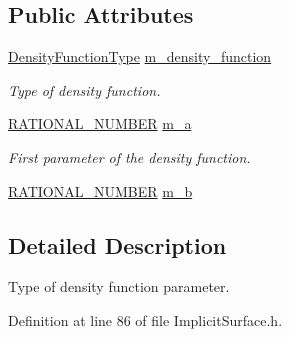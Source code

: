 \subsection*{Public Attributes}
\begin{DoxyCompactItemize}
\item 
\hyperlink{class_graphics_1_1_implicit_surface_ab19cb1eb5b21daefd95b6d007be5c199}{DensityFunctionType} \hyperlink{class_graphics_1_1_implicit_surface_1_1_density_function_parameter_type_a44b2e0b74f79d7665577633deb1ab5cc}{m\_\-density\_\-function}
\begin{DoxyCompactList}\small\item\em Type of density function. \end{DoxyCompactList}\item 
\hyperlink{namespace_utilities_a40969b96bd8d847b962e297cb79f08ce}{RATIONAL\_\-NUMBER} \hyperlink{class_graphics_1_1_implicit_surface_1_1_density_function_parameter_type_a723b894e3d93133824d36fc254ce2747}{m\_\-a}
\begin{DoxyCompactList}\small\item\em First parameter of the density function. \end{DoxyCompactList}\item 
\hyperlink{namespace_utilities_a40969b96bd8d847b962e297cb79f08ce}{RATIONAL\_\-NUMBER} \hyperlink{class_graphics_1_1_implicit_surface_1_1_density_function_parameter_type_ac06dddf51ad8733c4e8f54894a9cb64b}{m\_\-b}
\end{DoxyCompactItemize}


\subsection{Detailed Description}
Type of density function parameter. 

Definition at line 86 of file ImplicitSurface.h.



